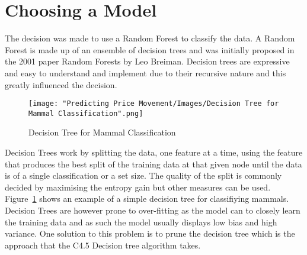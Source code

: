 	\section{Choosing a Model}
		The decision was made to use a Random Forest to classify the data. A Random Forest is made up of an ensemble of decision trees and was initially proposed in the 2001 paper Random Forests by Leo Breiman\cite{breiman2001random}. Decision trees are expressive and easy to understand and implement due to their recursive nature\cite{Flach:2012:MLA:2490546} and this greatly influenced the decision.\\ 
		
		
			\begin{figure}[H]
				\texttt{[image: "Predicting Price Movement/Images/Decision Tree for Mammal Classification".png]}
				\centering
				\caption{Decision Tree for Mammal Classification}
    				\label{fig:decisionTree}
			\end{figure}		
								
		Decision Trees work by splitting the data, one feature at a time, using the feature that produces the best split of the training data at that given node until the data is of a single classification or a set size. The quality of the split is commonly decided by maximising the entropy gain\cite{entropy} but other measures can be used. Figure~\ref{fig:decisionTree} shows an example of a simple decision tree for classifiying mammals. Decision Trees are however prone to over-fitting as the model can to closely learn the training data and as such the model usually displays low bias and high variance. One solution to this problem is to prune the decision tree which is the approach that the C4.5 Decision tree algorithm takes\cite{quinlan2014c4}.\\
	
